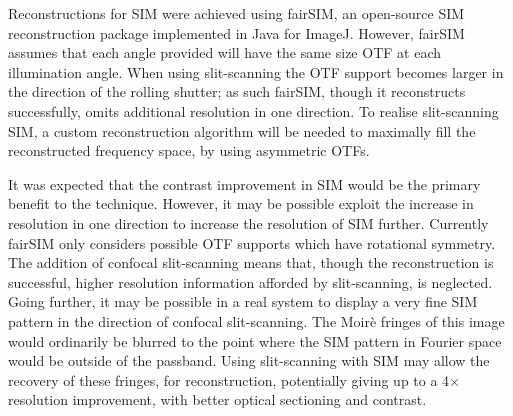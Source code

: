 Reconstructions for \gls{SIM} were achieved using fairSIM, an open-source \gls{SIM} reconstruction package implemented in Java for ImageJ\cite{mullerOpensourceImageReconstruction2016a}.
However, fairSIM assumes that each angle provided will have the same size \gls{OTF} at each illumination angle.
When using \gls{slit-scanning} the \gls{OTF} support becomes larger in the direction of the rolling shutter; as such fairSIM, though it reconstructs successfully, omits additional resolution in one direction.
To realise \gls{slit-scanning} \gls{SIM}, a custom reconstruction algorithm will be needed to maximally fill the reconstructed frequency space, by using asymmetric \gls{OTF}s.

It was expected that the contrast improvement in \gls{SIM} would be the primary benefit to the technique.
However, it may be possible exploit the increase in resolution in one direction to increase the resolution of \gls{SIM} further.
Currently fairSIM only considers possible OTF supports which have rotational symmetry.
The addition of confocal \gls{slit-scanning} means that, though the reconstruction is successful, higher resolution information afforded by \gls{slit-scanning}, is neglected.
Going further, it may be possible in a real system to display a very fine \gls{SIM} pattern in the direction of confocal \gls{slit-scanning}.
The Moirè fringes of this image would ordinarily be blurred to the point where the \gls{SIM} pattern in Fourier space would be outside of the passband.
Using \gls{slit-scanning} with \gls{SIM} may allow the recovery of these fringes, for reconstruction, potentially giving up to a 4$\times$ resolution improvement, with better optical sectioning and contrast.






